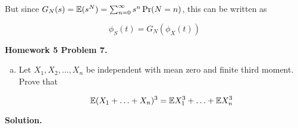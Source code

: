 But since \(G_N(s) = \E(s^N) = \sum_{n=0}^\infty s^n \Pr(N = n)\), this can be written as

\[
\phi_S(t) = G_N(\phi_X(t))
\]


\textbf{Homework 5 Problem 7.}

\begin{enumerate}[(a)]

\item Let \(X_1, X_2, \ldots, X_n\) be independent with mean zero and finite third moment. Prove that 

\[
\E(X_1 + \ldots + X_n)^3 = \E X_1^3 + \ldots + \E X_n^3
\]


\end{enumerate}

\textbf{Solution.}

